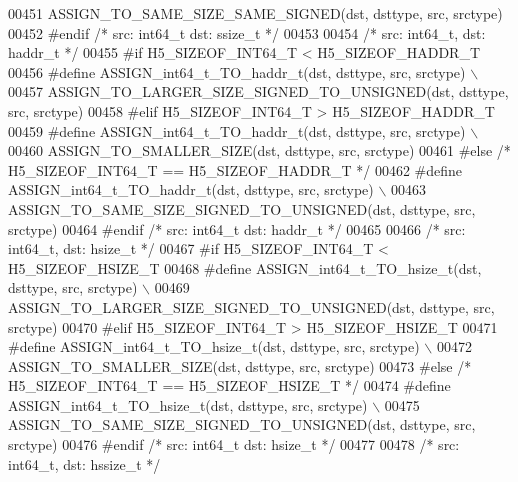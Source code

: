\begin{DoxyCode}
00451 \textcolor{preprocessor}{        ASSIGN\_TO\_SAME\_SIZE\_SAME\_SIGNED(dst, dsttype, src, srctype)}
00452 \textcolor{preprocessor}{#endif }\textcolor{comment}{/* src: int64\_t dst: ssize\_t */}\textcolor{preprocessor}{}
00453 
00454 \textcolor{comment}{/* src: int64\_t, dst: haddr\_t */}
00455 \textcolor{preprocessor}{#if H5\_SIZEOF\_INT64\_T < H5\_SIZEOF\_HADDR\_T}
00456 \textcolor{preprocessor}{    #define ASSIGN\_int64\_t\_TO\_haddr\_t(dst, dsttype, src, srctype) \(\backslash\)}
00457 \textcolor{preprocessor}{        ASSIGN\_TO\_LARGER\_SIZE\_SIGNED\_TO\_UNSIGNED(dst, dsttype, src, srctype)}
00458 \textcolor{preprocessor}{#elif H5\_SIZEOF\_INT64\_T > H5\_SIZEOF\_HADDR\_T}
00459 \textcolor{preprocessor}{    #define ASSIGN\_int64\_t\_TO\_haddr\_t(dst, dsttype, src, srctype) \(\backslash\)}
00460 \textcolor{preprocessor}{        ASSIGN\_TO\_SMALLER\_SIZE(dst, dsttype, src, srctype)}
00461 \textcolor{preprocessor}{#else }\textcolor{comment}{/* H5\_SIZEOF\_INT64\_T == H5\_SIZEOF\_HADDR\_T */}\textcolor{preprocessor}{}
00462 \textcolor{preprocessor}{    #define ASSIGN\_int64\_t\_TO\_haddr\_t(dst, dsttype, src, srctype) \(\backslash\)}
00463 \textcolor{preprocessor}{        ASSIGN\_TO\_SAME\_SIZE\_SIGNED\_TO\_UNSIGNED(dst, dsttype, src, srctype)}
00464 \textcolor{preprocessor}{#endif }\textcolor{comment}{/* src: int64\_t dst: haddr\_t */}\textcolor{preprocessor}{}
00465 
00466 \textcolor{comment}{/* src: int64\_t, dst: hsize\_t */}
00467 \textcolor{preprocessor}{#if H5\_SIZEOF\_INT64\_T < H5\_SIZEOF\_HSIZE\_T}
00468 \textcolor{preprocessor}{    #define ASSIGN\_int64\_t\_TO\_hsize\_t(dst, dsttype, src, srctype) \(\backslash\)}
00469 \textcolor{preprocessor}{        ASSIGN\_TO\_LARGER\_SIZE\_SIGNED\_TO\_UNSIGNED(dst, dsttype, src, srctype)}
00470 \textcolor{preprocessor}{#elif H5\_SIZEOF\_INT64\_T > H5\_SIZEOF\_HSIZE\_T}
00471 \textcolor{preprocessor}{    #define ASSIGN\_int64\_t\_TO\_hsize\_t(dst, dsttype, src, srctype) \(\backslash\)}
00472 \textcolor{preprocessor}{        ASSIGN\_TO\_SMALLER\_SIZE(dst, dsttype, src, srctype)}
00473 \textcolor{preprocessor}{#else }\textcolor{comment}{/* H5\_SIZEOF\_INT64\_T == H5\_SIZEOF\_HSIZE\_T */}\textcolor{preprocessor}{}
00474 \textcolor{preprocessor}{    #define ASSIGN\_int64\_t\_TO\_hsize\_t(dst, dsttype, src, srctype) \(\backslash\)}
00475 \textcolor{preprocessor}{        ASSIGN\_TO\_SAME\_SIZE\_SIGNED\_TO\_UNSIGNED(dst, dsttype, src, srctype)}
00476 \textcolor{preprocessor}{#endif }\textcolor{comment}{/* src: int64\_t dst: hsize\_t */}\textcolor{preprocessor}{}
00477 
00478 \textcolor{comment}{/* src: int64\_t, dst: hssize\_t */}

\end{DoxyCode}
